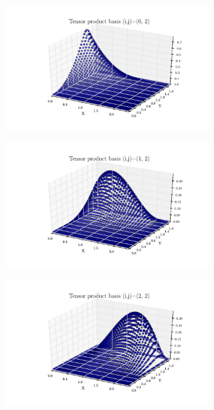 \documentclass[11pt,letterpaper]{article}
\begin{document}
  \begin{figure}[!tbh]
  \begin{subfigure}[b]{.6\textwidth}
    \includegraphics[width=\textwidth]{problem_2_2_0_2.pdf}
    \caption{}
    \label{fig4:label:a}
  \end{subfigure}
  \hfill
  \begin{subfigure}[b]{.6\textwidth}
    \includegraphics[width=\textwidth]{problem_2_2_1_2.pdf}
    \caption{}
    \label{fig4:label:b}
  \end{subfigure}
  \hfill
    \begin{subfigure}[b]{.6\textwidth}
    \includegraphics[width=\textwidth]{problem_2_2_2_2.pdf}

\end{subfigure}
\end{figure}
\end{document}
